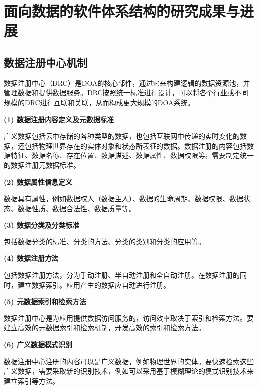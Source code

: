 \documentclass[article]{BJTU-thesis}
\begin{document}
	\section{面向数据的软件体系结构的研究成果与进展}
	
	\subsection{数据注册中心机制}
	数据注册中心（DRC）是DOA的核心部件，通过它来构建逻辑的数据资源池，并管理数据和提供数据服务。DRC按照统一标准进行设计，可以将各个行业或不同规模的DRC进行互联和关联，从而构成更大规模的DOA系统\cite{apriori}。
	\newline
	
	\noindent\textbf{(1) 数据注册内容定义及元数据标准}
	
	广义数据包括云中存储的各种类型的数据，也包括互联网中传递的实时变化的数据，还包括物理世界存在的实体对象和状态所表征的数据。数据注册的内容包括数据特征、数据名称、存在位置、数据描述、数据属性、数据权限等。需要制定统一的数据注册元数据标准。
	\newline
	
	\noindent\textbf{(2) 数据属性信息定义}
	
	数据具有属性，例如数据权人（数据主人）、数据的生命周期、数据权限、数据状态、数据性质、数据合法性、数据质量等。
	\newline
	
	\noindent\textbf{(3) 数据分类及分类标准}
	
	包括数据分类的标准、分类的方法、分类的类别和分类的应用等。
	\newline
	
	\noindent\textbf{(4) 数据注册方法}
	
	包括数据注册方法，分为手动注册、半自动注册和全自动注册。在数据注册的同时，建立数据索引。应用产生的数据应自动进行注册。
	\newline
	
	\noindent\textbf{(5) 元数据索引和检索方法}
	
	数据注册中心是为应用提供数据访问服务的，访问效率取决于索引和检索方法。要建立高效的元数据索引和检索机制，开发高效的索引和检索方法。
	\newline
	
	\noindent\textbf{(6) 广义数据模式识别}

	数据注册中心注册的内容可以是广义数据，例如物理世界的实体。要快速检索这些广义数据，需要采取新的识别技术，例如可以采用基于模糊理论的模式识别技术来建立索引等方法。
	\newline
	
\end{document}

